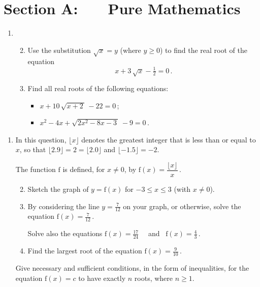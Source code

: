 \documentclass[a4, 11pt]{report}
\newlength{\qspace}
\newcounter{qnumber}
\newenvironment{question}%
 {\vspace{\qspace}
  \begin{enumerate}[\bfseries 1\quad][10]%
    \setcounter{enumi}{\value{qnumber}}%
    \item%
 }
{
  \end{enumerate}
  \filbreak
  \stepcounter{qnumber}
 }
\newenvironment{questionparts}[1][1]%
 {
  \begin{enumerate}[\bfseries (i)]%
    \setcounter{enumii}{#1}
    \addtocounter{enumii}{-1}
    \setlength{\itemsep}{5mm}
    \setlength{\parskip}{8pt}
 }
 {
  \end{enumerate}
 }
\def\f{{\mathrm f}}
\def\le{\leqslant}
\def\ge{\geqslant}
\begin{document}
\setcounter{page}{2}

 
\section*{Section A: \ \ \ Pure Mathematics}

\begin{question}
\begin{questionparts}
\item
Use the substitution $\sqrt x = y$ (where $y\ge0$) to find the 
real root of the equation
\[
x + 3\,  \sqrt x - \tfrac12 =0\,.
\]

\item Find all real roots  of the following equations:
\begin{itemize}
\setlength\itemindent {7pt}
\item [\bf (a) \ \ ] $x+10\,\sqrt{x+2\, }\,  -22 =0\,$;
\setlength\itemindent {8pt}
\item [\bf (b) \ \ ] $x^2 -4x  + \sqrt{2x^2 -8x-3 \,}\, -9 =0\,$.
\end{itemize}
\end{questionparts}
\end{question}

\begin{question}
In this question, $\lfloor x \rfloor$ denotes the greatest integer
that  is less than or equal to $x$, so that 
$\lfloor 2.9 \rfloor = 2 = \lfloor 2.0 \rfloor$
and
 $\lfloor -1.5 \rfloor = -2$.

The function $\f$ is defined, for $x\ne0$,
 by $\f(x) = \dfrac{\lfloor x \rfloor}{x}\,$.
\begin{questionparts}
\item Sketch the graph of $y=\f(x)$ for $-3\le x \le 3$ (with $x\ne0$).

\item By considering the line $y= \frac7{12}$ on your graph, or otherwise,
solve the equation $\f(x) = \frac7 {12}\,$.

Solve also the equations   $\f(x) =\frac{17}{24}$
 \ \ and \ $\f(x) = \frac{4 }{3 }\,$.

\item
Find the largest root of the equation $\f(x) =\frac9{10}\,$.


\end{questionparts}

Give necessary and sufficient conditions, in the form of inequalities,
for the equation $\f(x) =c$ to have exactly $n$ roots, where $n\ge1$. 
\end{question}
\end{document}
